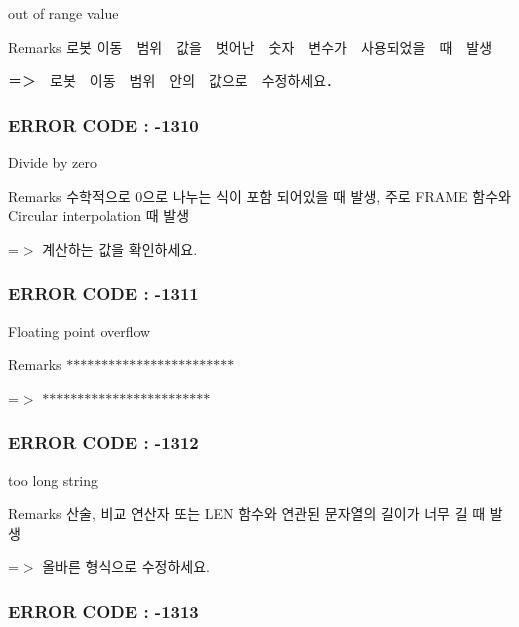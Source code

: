 out of range value \begin{DoxyRemark}{Remarks}
로봇 이동　범위　값을　벗어난　숫자　변수가　사용되었을　때　발생 \par
 ＝＞　로봇　이동　범위　안의　값으로　수정하세요．
\end{DoxyRemark}


 \subsubsection*{E\-R\-R\-O\-R C\-O\-D\-E \-: -\/1310 }

Divide by zero \begin{DoxyRemark}{Remarks}
수학적으로 0으로 나누는 식이 포함 되어있을 때 발생, 주로 F\-R\-A\-M\-E 함수와 Circular interpolation 때 발생 \par
 =$>$ 계산하는 값을 확인하세요.
\end{DoxyRemark}


 \subsubsection*{E\-R\-R\-O\-R C\-O\-D\-E \-: -\/1311 }

Floating point overflow \begin{DoxyRemark}{Remarks}
$\ast$$\ast$$\ast$$\ast$$\ast$$\ast$$\ast$$\ast$$\ast$$\ast$$\ast$$\ast$$\ast$$\ast$$\ast$$\ast$$\ast$$\ast$$\ast$$\ast$$\ast$$\ast$$\ast$$\ast$ \par
 =$>$ $\ast$$\ast$$\ast$$\ast$$\ast$$\ast$$\ast$$\ast$$\ast$$\ast$$\ast$$\ast$$\ast$$\ast$$\ast$$\ast$$\ast$$\ast$$\ast$$\ast$$\ast$$\ast$$\ast$$\ast$
\end{DoxyRemark}


 \subsubsection*{E\-R\-R\-O\-R C\-O\-D\-E \-: -\/1312 }

too long string \begin{DoxyRemark}{Remarks}
산술, 비교 연산자 또는 L\-E\-N 함수와 연관된 문자열의 길이가 너무 길 때 발생 \par
 =$>$ 올바른 형식으로 수정하세요.
\end{DoxyRemark}


 \subsubsection*{E\-R\-R\-O\-R C\-O\-D\-E \-: -\/1313 }

